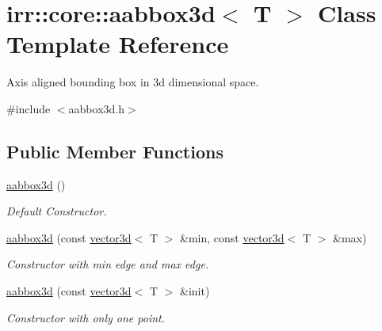 \hypertarget{classirr_1_1core_1_1aabbox3d}{}\section{irr\+:\+:core\+:\+:aabbox3d$<$ T $>$ Class Template Reference}
\label{classirr_1_1core_1_1aabbox3d}


Axis aligned bounding box in 3d dimensional space.  




{\ttfamily \#include $<$aabbox3d.\+h$>$}

\subsection*{Public Member Functions}
\begin{DoxyCompactItemize}
\item 
\mbox{\label{classirr_1_1core_1_1aabbox3d_aec7f681b248d9f0e07d62be0c921767e}} 
\hyperlink{classirr_1_1core_1_1aabbox3d_aec7f681b248d9f0e07d62be0c921767e}{aabbox3d} ()
\begin{DoxyCompactList}\small\item\em Default Constructor. \end{DoxyCompactList}\item 
\mbox{\label{classirr_1_1core_1_1aabbox3d_a7281018221a7c1070a5487cb98f2ac45}} 
\hyperlink{classirr_1_1core_1_1aabbox3d_a7281018221a7c1070a5487cb98f2ac45}{aabbox3d} (const \hyperlink{classirr_1_1core_1_1vector3d}{vector3d}$<$ T $>$ \&min, const \hyperlink{classirr_1_1core_1_1vector3d}{vector3d}$<$ T $>$ \&max)
\begin{DoxyCompactList}\small\item\em Constructor with min edge and max edge. \end{DoxyCompactList}\item 
\mbox{\label{classirr_1_1core_1_1aabbox3d_a1e1b49cb756eab5ba6dec051a6fa27c8}} 
\hyperlink{classirr_1_1core_1_1aabbox3d_a1e1b49cb756eab5ba6dec051a6fa27c8}{aabbox3d} (const \hyperlink{classirr_1_1core_1_1vector3d}{vector3d}$<$ T $>$ \&init)
\begin{DoxyCompactList}\small\item\em Constructor with only one point. \end{DoxyCompactList}\item 

\end{DoxyCompactItemize}
